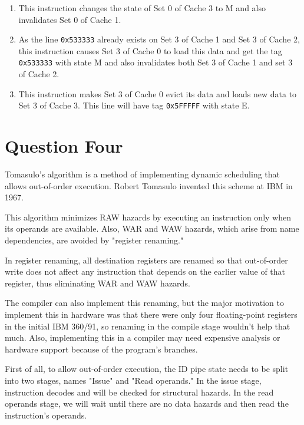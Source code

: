 \documentclass[12pt]{article}
\begin{document}
\begin{enumerate}[label=\alph*.]
\begin{enumerate}[label=\arabic*.]
	\item This instruction changes the state of Set 0 of Cache 3 to M and also invalidates Set 0 of Cache 1.
	
	\item
	As the line \Verb+0x533333+ already exists on Set 3 of Cache 1 and Set 3 of Cache 2, this instruction causes Set 3 of Cache 0 to load this data and get the tag \Verb+0x533333+ with state M and also invalidates both Set 3 of Cache 1 and set 3 of Cache 2.
	
	\item
	This instruction makes Set 3 of Cache 0 evict its data and loads new data to Set 3 of Cache 3. This line will have tag \Verb+0x5FFFFF+ with state E.
\end{enumerate}

\end{enumerate}
	
\newpage

\section{Question Four}
Tomasulo's algorithm is a method of implementing dynamic scheduling that allows out-of-order execution. Robert Tomasulo invented this scheme at IBM in 1967.

This algorithm minimizes RAW hazards by executing an instruction only when its operands are available. Also, WAR and WAW hazards, which arise from name dependencies, are avoided by "register renaming."

In register renaming, all destination registers are renamed so that out-of-order write does not affect any instruction that depends on the earlier value of that register, thus eliminating WAR and WAW hazards.

The compiler can also implement this renaming, but the major motivation to implement this in hardware was that there were only four floating-point registers in the initial IBM 360/91, so renaming in the compile stage wouldn't help that much. Also, implementing this in a compiler may need expensive analysis or hardware support because of the program's branches.

First of all, to allow out-of-order execution, the ID pipe state needs to be split into two stages, names "Issue" and "Read operands." In the issue stage, instruction decodes and will be checked for structural hazards. In the read operands stage, we will wait until there are no data hazards and then read the instruction's operands.
\end{document}
